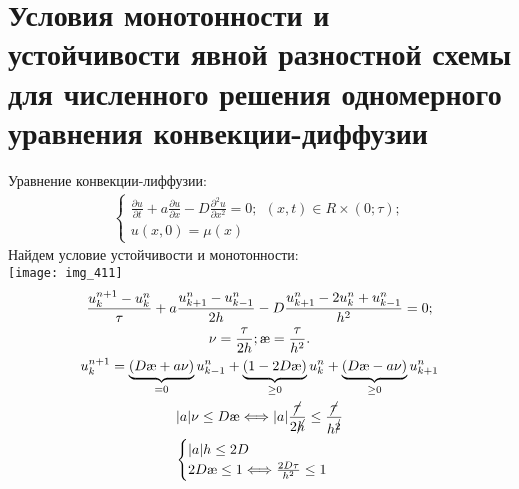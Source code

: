 \documentclass[__main__.tex]{subfiles}
\begin{document}
\section{Условия монотонности и устойчивости явной разностной схемы для численного решения одномерного уравнения конвекции-диффузии}

Уравнение конвекции-лиффузии:\\
\begin{gather}
\begin{cases}
\frac{\partial u}{\partial t} + a \frac{\partial u}{\partial x} - D \frac{\partial ^2 u}{\partial x^2} = 0; \ \ (x,t) \in R \times (0; \tau);\\
u(x,0) = \mu(x)
\end{cases}
\end{gather}
Найдем условие устойчивости и монотонности:\\
\texttt{[image: img\_411]}\\
\begin{gather}
\frac{u_{k}^{n+1} - u_{k}^{n}}{\tau} + a \frac{u_{k+1}^{n} - u_{k-1}^{n}}{2h} - D \frac{u_{k+1}^{n} - 2u_{k}^{n} + u_{k-1}^{n}}{h^2} = 0;\\
\nu = \frac{\tau}{2h}; \text\ae = \frac{\tau}{h^2}.\\
u_{k}^{n+1} = \underbrace{(D \text\ae + a \nu)}_{=0} u_{k-1}^{n} + \underbrace{(1-2D \text\ae)}_{\geq 0} u_{k}^{n} + \underbrace{(D \text\ae - a \nu)}_{\geq 0} u_{k+1}^{n}\\
|a|\nu \leq D \text\ae \Longleftrightarrow |a|\frac{\cancel{\tau}}{2 \cancel{h}} \leq \frac{\cancel{\tau}}{h^{\cancel{2}}}\\
\begin{cases}
|a|h \leq 2D \\
2D \text\ae \leq 1 \Longleftrightarrow \frac{2D \tau}{h^2} \leq 1
\end{cases}
\end{gather}
\end{document}
